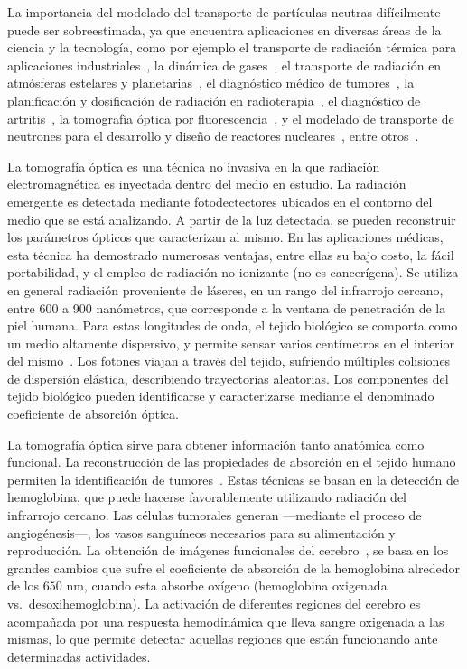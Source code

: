 La importancia del modelado del transporte de partículas neutras 
difícilmente puede ser sobreestimada, ya que encuentra aplicaciones 
en diversas áreas de la ciencia y la tecnología, 
como por ejemplo el transporte de radiación 
 térmica para aplicaciones industriales~\cite{Howell2010, Thynell1998}, 
 la dinámica de gases~\cite{Duderstadt1979}, 
 el transporte de radiación en atmósferas estelares y 
 planetarias~\cite{Qin2015, Dymond1997, Chandrasekhar1960}, 
 el diagnóstico médico de tumores~\cite{Zhu2005, Zhu2010, Fujii2016b}, 
 la planificación y dosificación de radiación en radioterapia~\cite{Vassiliev2010,Bedford2019}, 
 el diagnóstico de artritis~\cite{Klose2002, Netz2001}, 
 la tomografía óptica por fluorescencia~\cite{Klose2005,Klose2010, Ren2010},
 y el modelado de transporte de neutrones para el desarrollo 
 y diseño de reactores nucleares~\cite{Larsen2006, Sanchez1982, Anli2006}, 
 entre otros~\cite {Mishchenko1999, Prasher2003}. 
  
 La tomografía óptica es una técnica no invasiva en la que
 radiación electromagnética es inyectada dentro del medio
 en estudio.
 La radiación emergente es detectada mediante fotodectectores 
 ubicados en el contorno del medio que se está analizando. 
 A partir de la luz detectada, se pueden reconstruir
 los parámetros ópticos que caracterizan al mismo.
 En las aplicaciones médicas, esta técnica ha demostrado numerosas 
 ventajas, entre ellas su bajo costo, la fácil portabilidad, y 
 el empleo de radiación no ionizante (no es cancerígena). 
 Se utiliza en general radiación proveniente de láseres, en un 
 rango del infrarrojo cercano, entre 600 a 900 nanómetros, que 
 corresponde a la ventana de penetración de la piel humana.
 Para estas longitudes de onda, el tejido 
 biológico se comporta como un medio altamente dispersivo, y 
 permite sensar varios centímetros en el interior del mismo~\cite{Boas2001}.
Los fotones viajan a través del tejido, sufriendo múltiples colisiones 
 de dispersión elástica, describiendo trayectorias aleatorias.
 Los componentes del tejido biológico pueden identificarse y caracterizarse
 mediante el denominado coeficiente de absorción óptica.
 
La tomografía óptica sirve para obtener información tanto anatómica como funcional.
La reconstrucción de las propiedades de absorción en el tejido humano 
 permiten la identificación de tumores~\cite{Zhu2005, Zhu2010, Fujii2016b}.
Estas técnicas se basan en la detección de hemoglobina, que puede hacerse 
favorablemente utilizando radiación del infrarrojo cercano.
Las células tumorales generan ---mediante el proceso de angiogénesis---, 
los vasos sanguíneos necesarios para su alimentación y reproducción.
La obtención de imágenes funcionales del cerebro~\cite{Boas2001, bluestone2001, Arridge1999}, se basa en los grandes cambios 
que sufre el coeficiente de absorción de la hemoglobina 
alrededor de los $650$ nm, cuando esta absorbe oxígeno 
(hemoglobina oxigenada vs.~desoxihemoglobina). 
 La activación de diferentes regiones del cerebro 
 es acompañada por una respuesta hemodinámica que lleva sangre oxigenada 
 a las mismas, lo que permite detectar aquellas regiones que están funcionando 
 ante determinadas actividades. 
 
 
 
\pagestyle{empty}

%


